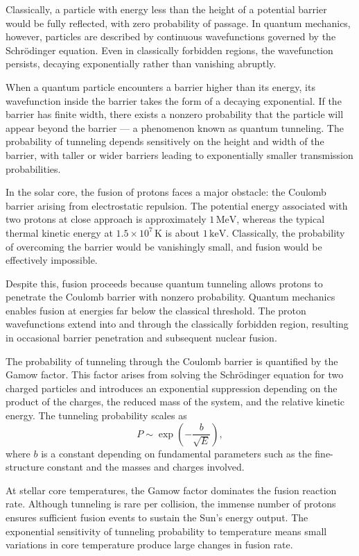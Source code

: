 Classically, a particle with energy less than the height of a potential barrier would be fully reflected, with zero probability of passage. In quantum mechanics, however, particles are described by continuous wavefunctions governed by the Schrödinger equation. Even in classically forbidden regions, the wavefunction persists, decaying exponentially rather than vanishing abruptly.

When a quantum particle encounters a barrier higher than its energy, its wavefunction inside the barrier takes the form of a decaying exponential. If the barrier has finite width, there exists a nonzero probability that the particle will appear beyond the barrier — a phenomenon known as quantum tunneling. The probability of tunneling depends sensitively on the height and width of the barrier, with taller or wider barriers leading to exponentially smaller transmission probabilities.

In the solar core, the fusion of protons faces a major obstacle: the Coulomb barrier arising from electrostatic repulsion. The potential energy associated with two protons at close approach is approximately $1\,\text{MeV}$, whereas the typical thermal kinetic energy at $1.5 \times 10^7\,\text{K}$ is about $1\,\text{keV}$. Classically, the probability of overcoming the barrier would be vanishingly small, and fusion would be effectively impossible.

Despite this, fusion proceeds because quantum tunneling allows protons to penetrate the Coulomb barrier with nonzero probability. Quantum mechanics enables fusion at energies far below the classical threshold. The proton wavefunctions extend into and through the classically forbidden region, resulting in occasional barrier penetration and subsequent nuclear fusion.

The probability of tunneling through the Coulomb barrier is quantified by the Gamow factor. This factor arises from solving the Schrödinger equation for two charged particles and introduces an exponential suppression depending on the product of the charges, the reduced mass of the system, and the relative kinetic energy. The tunneling probability scales as
\[
P \sim \exp\left( -\frac{b}{\sqrt{E}} \right),
\]
where \( b \) is a constant depending on fundamental parameters such as the fine-structure constant and the masses and charges involved.

At stellar core temperatures, the Gamow factor dominates the fusion reaction rate. Although tunneling is rare per collision, the immense number of protons ensures sufficient fusion events to sustain the Sun's energy output. The exponential sensitivity of tunneling probability to temperature means small variations in core temperature produce large changes in fusion rate.

